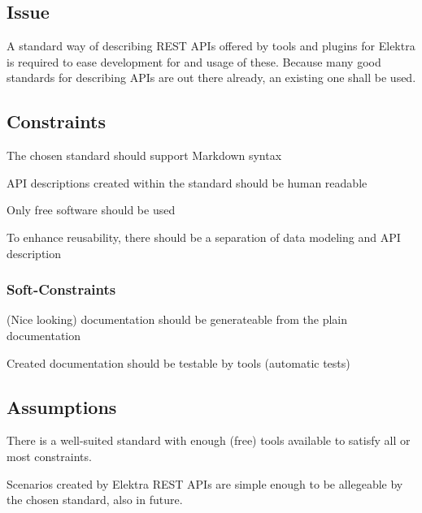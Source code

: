 \subsection*{Issue}

A standard way of describing R\+E\+ST A\+P\+Is offered by tools and plugins for Elektra is required to ease development for and usage of these. Because many good standards for describing A\+P\+Is are out there already, an existing one shall be used.

\subsection*{Constraints}


\begin{DoxyItemize}
\item The chosen standard should support Markdown syntax
\item A\+PI descriptions created within the standard should be human readable
\item Only free software should be used
\item To enhance reusability, there should be a separation of data modeling and A\+PI description
\end{DoxyItemize}

\subsubsection*{Soft-\/\+Constraints}


\begin{DoxyItemize}
\item (Nice looking) documentation should be generateable from the plain documentation
\item Created documentation should be testable by tools (automatic tests)
\end{DoxyItemize}

\subsection*{Assumptions}


\begin{DoxyItemize}
\item There is a well-\/suited standard with enough (free) tools available to satisfy all or most constraints.
\item Scenarios created by Elektra R\+E\+ST A\+P\+Is are simple enough to be allegeable by the chosen standard, also in future.
\end{DoxyItemize}

